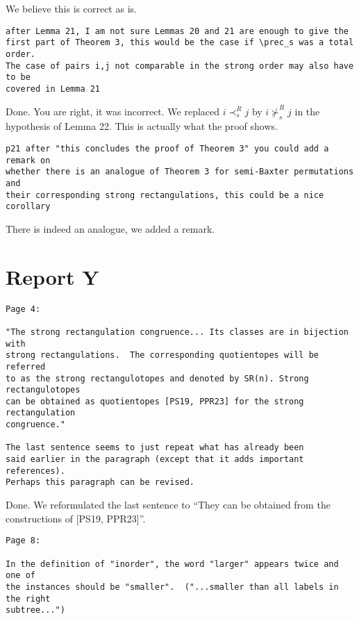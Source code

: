 \documentclass{article}
\begin{document}
We believe this is correct as is.

\begin{verbatim}
after Lemma 21, I am not sure Lemmas 20 and 21 are enough to give the 
first part of Theorem 3, this would be the case if \prec_s was a total order. 
The case of pairs i,j not comparable in the strong order may also have to be 
covered in Lemma 21
\end{verbatim}

Done. You are right, it was incorrect. We replaced $i \prec_s^R j$ by $i \not\succ_s^R j$ in the hypothesis of Lemma 22. This is actually what the proof shows.

\begin{verbatim}
p21 after "this concludes the proof of Theorem 3" you could add a remark on 
whether there is an analogue of Theorem 3 for semi-Baxter permutations and 
their corresponding strong rectangulations, this could be a nice corollary
\end{verbatim}

There is indeed an analogue, we added a remark.

\section{Report Y}

\begin{verbatim}
Page 4:

"The strong rectangulation congruence... Its classes are in bijection with 
strong rectangulations.  The corresponding quotientopes will be referred 
to as the strong rectangulotopes and denoted by SR(n). Strong rectangulotopes 
can be obtained as quotientopes [PS19, PPR23] for the strong rectangulation 
congruence." 

The last sentence seems to just repeat what has already been 
said earlier in the paragraph (except that it adds important references).  
Perhaps this paragraph can be revised.
\end{verbatim}

Done. We reformulated the last sentence to ``They can be obtained from the constructions of [PS19, PPR23]''.

\begin{verbatim}
Page 8:

In the definition of "inorder", the word "larger" appears twice and one of 
the instances should be "smaller".  ("...smaller than all labels in the right 
subtree...")
\end{verbatim}
\end{document}
